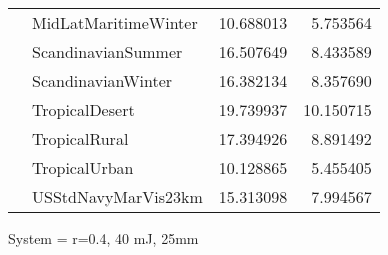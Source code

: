 \begin{tabular}{llrr}
             & MidLatMaritimeWinter &  10.688013 &   5.753564 \\
             & ScandinavianSummer &  16.507649 &   8.433589 \\
             & ScandinavianWinter &  16.382134 &   8.357690 \\
             & TropicalDesert &  19.739937 &  10.150715 \\
             & TropicalRural &  17.394926 &   8.891492 \\
             & TropicalUrban &  10.128865 &   5.455405 \\
             & USStdNavyMarVis23km &  15.313098 &   7.994567 \\
\bottomrule
\end{tabular}


\clearpage
System = r=0.4, 40 mJ, 25mm

